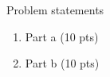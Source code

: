 
\item Problem statements

\begin{enumerate}

\item Part a (10 pts)

\ansfont{
}
\vfill

\item Part b (10 pts)

\ansfont{
}
\vfill

\end{enumerate}
